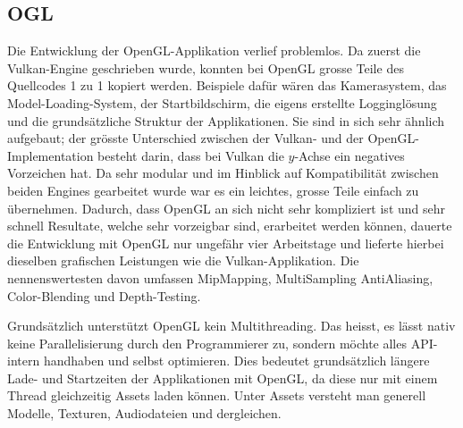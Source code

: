 \documentclass[titlepage, 11pt, a4paper, ngerman]{article}
\begin{document}
\subsection{OGL}
Die Entwicklung der \acrshort{OpenGL}-Applikation verlief problemlos. Da zuerst die Vulkan-\gls{Engine} geschrieben wurde, konnten bei \acrshort{OpenGL} grosse Teile des Quellcodes 1 zu 1 kopiert werden. Beispiele dafür wären das Kamerasystem, das Model-Loading-System, der Startbildschirm, die eigens erstellte Logginglösung und die grundsätzliche Struktur der Applikationen. Sie sind in sich sehr ähnlich aufgebaut; der grösste Unterschied zwischen der Vulkan- und der \acrshort{OpenGL}-Implementation besteht darin, dass bei Vulkan die $y$-Achse ein negatives Vorzeichen hat. Da sehr modular und im Hinblick auf Kompatibilität zwischen beiden \glspl{Engine} gearbeitet wurde war es ein leichtes, grosse Teile einfach zu übernehmen. Dadurch, dass \acrshort{OpenGL} an sich nicht sehr kompliziert ist und sehr schnell Resultate, welche sehr vorzeigbar sind, erarbeitet werden können, dauerte die Entwicklung mit \acrshort{OpenGL} nur ungefähr vier Arbeitstage und lieferte hierbei dieselben grafischen Leistungen wie die Vulkan-Applikation. Die nennenswertesten davon umfassen MipMapping, MultiSampling AntiAliasing, Color-Blending und Depth-Testing. \par
Grundsätzlich unterstützt \acrshort{OpenGL} kein \gls{Multithreading}. Das heisst, es lässt nativ keine Parallelisierung durch den Programmierer zu, sondern möchte alles \acrshort{API}-intern handhaben und selbst optimieren. Dies bedeutet grundsätzlich längere Lade- und Startzeiten der Applikationen mit \acrshort{OpenGL}, da diese nur mit einem Thread gleichzeitig Assets laden können. Unter Assets versteht man generell Modelle, Texturen, Audiodateien und dergleichen.
\end{document}
